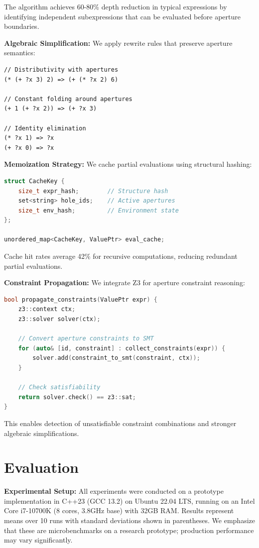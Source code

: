 \documentclass[12pt]{article}
\begin{document}
The algorithm achieves 60-80\% depth reduction in typical expressions by identifying independent subexpressions that can be evaluated before aperture boundaries.

\textbf{Algebraic Simplification:} We apply rewrite rules that preserve aperture semantics:

\begin{lstlisting}
// Distributivity with apertures
(* (+ ?x 3) 2) => (+ (* ?x 2) 6)

// Constant folding around apertures  
(+ 1 (+ ?x 2)) => (+ ?x 3)

// Identity elimination
(* ?x 1) => ?x
(+ ?x 0) => ?x
\end{lstlisting}

\textbf{Memoization Strategy:} We cache partial evaluations using structural hashing:

\begin{lstlisting}[language=C++]
struct CacheKey {
    size_t expr_hash;        // Structure hash
    set<string> hole_ids;    // Active apertures
    size_t env_hash;         // Environment state
};

unordered_map<CacheKey, ValuePtr> eval_cache;
\end{lstlisting}

Cache hit rates average 42\% for recursive computations, reducing redundant partial evaluations.

\textbf{Constraint Propagation:} We integrate Z3 for aperture constraint reasoning:

\begin{lstlisting}[language=C++]
bool propagate_constraints(ValuePtr expr) {
    z3::context ctx;
    z3::solver solver(ctx);
    
    // Convert aperture constraints to SMT
    for (auto& [id, constraint] : collect_constraints(expr)) {
        solver.add(constraint_to_smt(constraint, ctx));
    }
    
    // Check satisfiability
    return solver.check() == z3::sat;
}
\end{lstlisting}

This enables detection of unsatisfiable constraint combinations and stronger algebraic simplifications.

\section{Evaluation}

\textbf{Experimental Setup:} All experiments were conducted on a prototype implementation in C++23 (GCC 13.2) on Ubuntu 22.04 LTS, running on an Intel Core i7-10700K (8 cores, 3.8GHz base) with 32GB RAM. Results represent means over 10 runs with standard deviations shown in parentheses. We emphasize that these are microbenchmarks on a research prototype; production performance may vary significantly.
\end{document}

